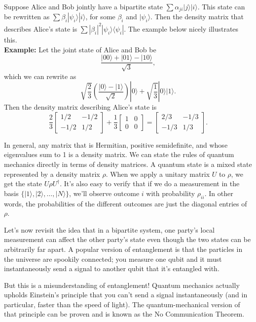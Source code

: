 \documentclass[11pt]{report}
\theoremstyle{plain}
\theoremstyle{definition}
\renewcommand{\ket}[1]{|#1\rangle}
\newcommand{\ketbra}[2]{|#1\rangle\!\langle#2|}
\begin{document}
Suppose Alice and Bob jointly have a bipartite state $\sum \alpha_{ji} \ket{j} \ket{i}$. This state can be rewritten as $\sum \beta_i \ket{\psi_i} \ket{i}$, for some $\beta_i$ and $\ket{\psi_i}$. Then the density matrix that describes Alice's state is $\sum |\beta_i|^2 \ketbra{\psi_i}{\psi_i}$. The example below nicely illustrates this.
\\
\noindent
{\bf Example:} Let the joint state of Alice and Bob be
\[
\frac{\ket{00} + \ket{01} - \ket{10}}{\sqrt{3}},
\]
which we can rewrite as
\[
\sqrt{\frac{2}{3}} \left( \frac{\ket{0} - \ket{1}}{\sqrt{2}} \right) \ket{0} + \sqrt{\frac{1}{3}} \ket{0}\ket{1}.
\]
Then the density matrix describing Alice's state is
\[
   \frac{2}{3} \begin{bmatrix}
		     1/2 & -1/2 \\
		     -1/2 & 1/2
		    \end{bmatrix}        +  \frac{1}{3} \begin{bmatrix}
									1 & 0 \\
									0 & 0
									\end{bmatrix}
= \begin{bmatrix}
2/3 & -1/3 \\
-1/3 & 1/3
\end{bmatrix}.
\]

In general, any matrix that is Hermitian, positive semidefinite, and whose eigenvalues sum to 1 is a density matrix. We can state the rules of quantum mechanics directly in terms of density matrices. A quantum state is a mixed state represented by a density matrix $\rho$.  When we apply a unitary matrix $U$ to $\rho$, we get the state $U \rho U^\dagger$. It's also easy to verify that if we do a measurement in the basis $\{\ket{1}, \ket{2}, \ldots, \ket{N}\}$, we'll observe outcome $i$ with probability $\rho_{ii}$. In other words, the probabilities of the different outcomes are just the diagonal entries of $\rho$.

\bigskip

Let's now revisit the idea that in a bipartite system, one party's local measurement can affect the other party's state even though the two states can be arbitrarily far apart. A popular version of entanglement is that the particles in the universe are spookily connected; you measure one qubit and it must instantaneously send a signal to another qubit that it's entangled with.

But this is a misunderstanding of entanglement! Quantum mechanics actually upholds Einstein's principle that you can't send a signal instantaneously (and in particular, faster than the speed of light). The quantum-mechanical version of that principle can be proven and is known as the No Communication Theorem.
\end{document}
